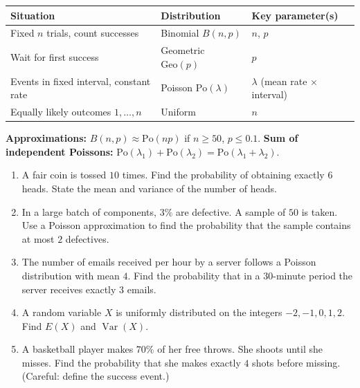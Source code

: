 \documentclass[11pt]{article}
\begin{document}
\begin{aretenir}
\begin{center}
\begin{tabular}{|l|l|l|}
\hline
\rowcolor{popblueL} \textbf{Situation} & \textbf{Distribution} & \textbf{Key parameter(s)} \\
\hline
Fixed $n$ trials, count successes & Binomial $B(n,p)$ & $n$, $p$ \\
\hline
Wait for first success & Geometric $\mathrm{Geo}(p)$ & $p$ \\
\hline
Events in fixed interval, constant rate & Poisson $\mathrm{Po}(\lambda)$ & $\lambda$ (mean rate $\times$ interval) \\
\hline
Equally likely outcomes $1,\ldots,n$ & Uniform & $n$ \\
\hline
\end{tabular}
\end{center}
\textbf{Approximations:} $B(n,p) \approx \mathrm{Po}(np)$ if $n \ge 50$, $p \le 0.1$.
\textbf{Sum of independent Poissons:} $\mathrm{Po}(\lambda_1) + \mathrm{Po}(\lambda_2) = \mathrm{Po}(\lambda_1+\lambda_2)$.
\end{aretenir}

\begin{exercice}
\begin{enumerate}
\item A fair coin is tossed $10$ times. Find the probability of obtaining exactly $6$ heads. State the mean and variance of the number of heads.
\item In a large batch of components, $3\%$ are defective. A sample of $50$ is taken. Use a Poisson approximation to find the probability that the sample contains at most $2$ defectives.
\item The number of emails received per hour by a server follows a Poisson distribution with mean $4$. Find the probability that in a $30$-minute period the server receives exactly $3$ emails.
\item A random variable $X$ is uniformly distributed on the integers $-2, -1, 0, 1, 2$. Find $E(X)$ and $\operatorname{Var}(X)$.
\item A basketball player makes $70\%$ of her free throws. She shoots until she misses. Find the probability that she makes exactly $4$ shots before missing. (Careful: define the success event.)
\end{enumerate}
\end{exercice}
\end{document}
